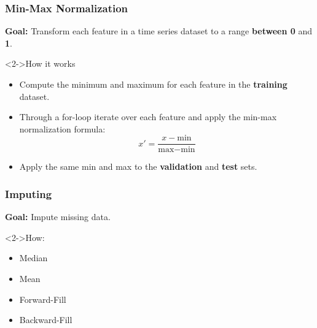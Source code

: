 \documentclass[t,english]{beamer}
\begin{document}
\begin{frame}
  \frametitle{Min-Max Normalization}
  \textbf{Goal:} Transform each feature in a time series dataset to a range \textbf{between 0} and \textbf{1}.

  \begin{block}<2->{How it works}
    \begin{itemize}
      \item<2-> Compute the minimum and maximum for each feature in the \textbf{training} dataset.
      \item<3-> Through a for-loop iterate over each feature and apply the min-max normalization formula:
            \begin{equation}
              x' = \frac{x - \text{min}}{\text{max} - \text{min}}
            \end{equation}
      \item<4-> Apply the same min and max to the \textbf{validation} and \textbf{test} sets.
    \end{itemize}
  \end{block}
\end{frame}

\begin{frame}
  \frametitle{Imputing}
  \textbf{Goal:} Impute missing data.

  \begin{block}<2->{How:}
    \begin{itemize}
      \item<2-> Median
      \item <3-> Mean
      \item <4-> Forward-Fill
      \item <5-> Backward-Fill
    \end{itemize}
  \end{block}
\end{frame}
\end{document}
